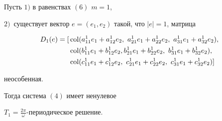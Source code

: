 \begin{thm} 


Пусть $1)$ в равенствах $(6)$ $m=1$, 





$2)$~существует вектор $e=(e_1,e_2)$ такой, что $|e|=1$, матрица 


\begin{align} 


D_1(e)=[&\col(a^1_{11}e_1+a^1_{12}e_2,\ a^1_{21}e_1+ 


a^1_{22}e_2,\ a^1_{31}e_1+a^1_{32}e_2),\notag\\ 


&\col(b^1_{11}e_1+ 


b^1_{12}e_2, 


b^1_{21}e_1+b^1_{22}e_2,\ b^1_{31}e_1+b^1_{32}e_2),\notag\\ 


&\col(c^1_{11}e_1+c^1_{12}e_2,\ c^1_{21}e_1+ 


c^1_{22}e_2,\ c^1_{31}e_1+c^1_{32}e_2)] 


\end{align} 


неособенная. 


 


Тогда система $(4)$ имеет ненулевое 


$T_1=\frac{2\pi}{\omega}$-периодическое решение. 


\end{thm} 


 



